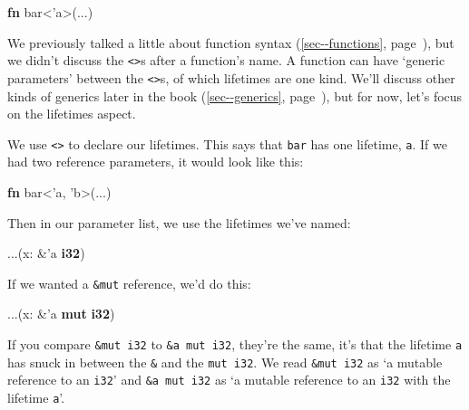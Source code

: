 \documentclass[a4paper,]{book}
\renewcommand*{\hyperref}[2][\ar]{%
  \def\ar{#2}%
  #2 (\autoref{#1}, page~\pageref{#1})}
\newenvironment{Shaded}{\begin{snugshade}}{\end{snugshade}}
\newcommand{\KeywordTok}[1]{\textcolor[rgb]{0.13,0.29,0.53}{\textbf{{#1}}}}
\newcommand{\OtherTok}[1]{\textcolor[rgb]{0.56,0.35,0.01}{{#1}}}
\newcommand{\NormalTok}[1]{{#1}}
\begin{document}
\begin{Shaded}
\begin{Highlighting}[]
\KeywordTok{fn} \NormalTok{bar<}\OtherTok{'a}\NormalTok{>(...)}
\end{Highlighting}
\end{Shaded}

We previously talked a little about \hyperref[sec--functions]{function
syntax}, but we didn't discuss the \texttt{\textless{}\textgreater{}}s
after a function's name. A function can have `generic parameters'
between the \texttt{\textless{}\textgreater{}}s, of which lifetimes are
one kind. We'll discuss other kinds of generics
\hyperref[sec--generics]{later in the book}, but for now, let's focus on
the lifetimes aspect.

We use \texttt{\textless{}\textgreater{}} to declare our lifetimes. This
says that \texttt{bar} has one lifetime, \texttt{\textquotesingle{}a}.
If we had two reference parameters, it would look like this:

\begin{Shaded}
\begin{Highlighting}[]
\KeywordTok{fn} \NormalTok{bar<}\OtherTok{'a}\NormalTok{, }\OtherTok{'b}\NormalTok{>(...)}
\end{Highlighting}
\end{Shaded}

Then in our parameter list, we use the lifetimes we've named:

\begin{Shaded}
\begin{Highlighting}[]
\NormalTok{...(x: &}\OtherTok{'a} \KeywordTok{i32}\NormalTok{)}
\end{Highlighting}
\end{Shaded}

If we wanted a \texttt{\&mut} reference, we'd do this:

\begin{Shaded}
\begin{Highlighting}[]
\NormalTok{...(x: &}\OtherTok{'a} \KeywordTok{mut} \KeywordTok{i32}\NormalTok{)}
\end{Highlighting}
\end{Shaded}

If you compare \texttt{\&mut\ i32} to
\texttt{\&\textquotesingle{}a\ mut\ i32}, they're the same, it's that
the lifetime \texttt{\textquotesingle{}a} has snuck in between the
\texttt{\&} and the \texttt{mut\ i32}. We read \texttt{\&mut\ i32} as `a
mutable reference to an \texttt{i32}' and
\texttt{\&\textquotesingle{}a\ mut\ i32} as `a mutable reference to an
\texttt{i32} with the lifetime \texttt{\textquotesingle{}a}'.
\end{document}
